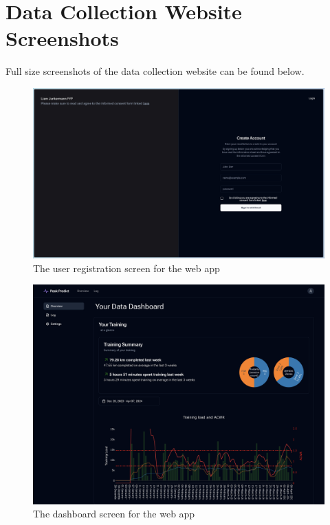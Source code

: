 \newpage
\section{Data Collection Website Screenshots}
Full size screenshots of the data collection website can be found below.
\begin{figure}[!hp]
  \centering
  \includegraphics[width=\textwidth]{figures/fyp_register.jpeg}
  \captionsetup{justification=centering}
  \caption*{The user registration screen for the web app} \label{fig:app_webapp_register}
\end{figure}
\begin{figure}[!hp]
  \centering
  \includegraphics[width=\textwidth]{figures/fyp_dash_overview.png}
  \captionsetup{justification=centering}
  \caption*{The dashboard screen for the web app} \label{fig:app_webapp_dashboard}
\end{figure}
